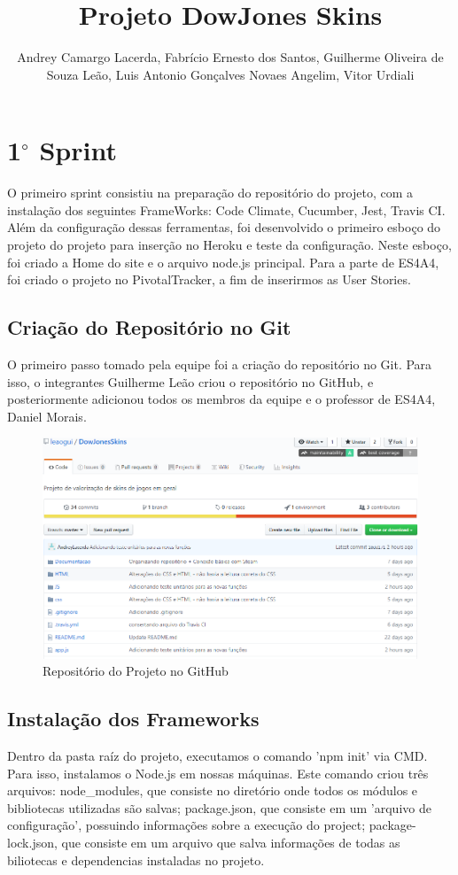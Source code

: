 \documentclass[a4paper,12pt]{article}
\title{Projeto DowJones Skins}
\author{Andrey Camargo Lacerda, Fabrício Ernesto dos Santos, Guilherme Oliveira de Souza Leão, Luis Antonio Gonçalves Novaes Angelim, Vitor Urdiali}
\begin{document}
    \setlength{\parindent}{1.25cm}

    \section{1$^{\circ}$ Sprint}
    O primeiro sprint consistiu na preparação do repositório do projeto, com a instalação dos seguintes
    FrameWorks: Code Climate, Cucumber, Jest, Travis CI. Além da configuração dessas ferramentas,
    foi desenvolvido o primeiro esboço do projeto do projeto para inserção no Heroku e teste da configuração.
    Neste esboço, foi criado a Home do site e o arquivo node.js principal. Para a parte de ES4A4,
    foi criado o projeto no PivotalTracker, a fim de inserirmos as User Stories.

    \subsection{Criação do Repositório no Git}
    O primeiro passo tomado pela equipe foi a criação do repositório no Git. Para isso, o integrantes
    Guilherme Leão criou o repositório no GitHub, e posteriormente adicionou todos os membros
    da equipe e o professor de ES4A4, Daniel Morais.\\
    \begin{figure}[!htb]
        \centering
        \includegraphics[scale=0.6]{Imagens/Repositorio.png}
        \caption{Repositório do Projeto no GitHub}
    \end{figure}

    \subsection{Instalação dos Frameworks}
    Dentro da pasta raíz do projeto, executamos o comando 'npm init' via CMD. Para isso, instalamos o Node.js
    em nossas máquinas. Este comando criou três arquivos: node\_modules, que consiste no diretório onde todos
    os módulos e bibliotecas utilizadas são salvas; package.json, que consiste em um 'arquivo de configuração',
    possuindo informações sobre a execução do project; package-lock.json, que consiste em um arquivo que salva
    informações de todas as biliotecas e dependencias instaladas no projeto.
    
\end{document}
